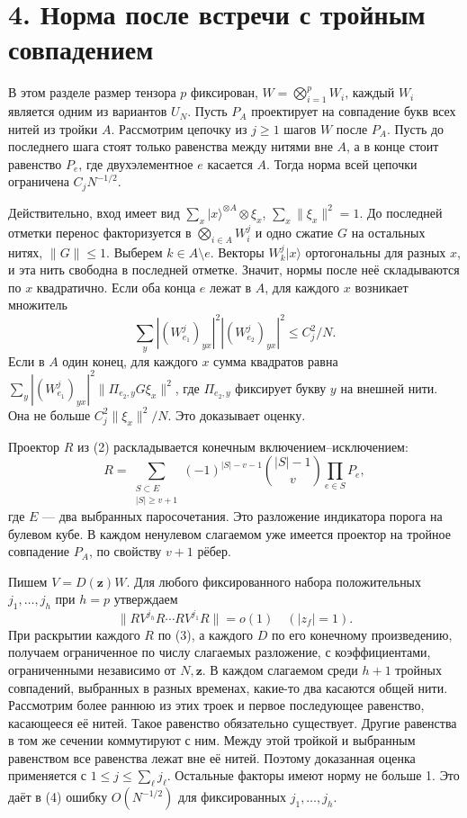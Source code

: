 \documentclass[11pt,a4paper]{article}
\newcommand{\sect}[1]{\section*{\sffamily\color{ink}#1}}
\begin{document}
\newpage
\sect{4. Норма после встречи с тройным совпадением}
В этом разделе размер тензора \(p\) фиксирован, \(W=\bigotimes_{i=1}^p W_i\), каждый \(W_i\) является одним из вариантов \(U_N\).
Пусть \(P_A\) проектирует на совпадение букв всех нитей из тройки \(A\).
Рассмотрим цепочку из \(j\ge1\) шагов \(W\) после \(P_A\). Пусть до последнего шага стоят только равенства между нитями вне \(A\), а в конце стоит равенство \(P_e\), где двухэлементное \(e\) касается \(A\). Тогда норма всей цепочки ограничена \(C_j N^{-1/2}\).

Действительно, вход имеет вид \(\sum_x |x\rangle^{\otimes A}\otimes \xi_x\),
\(\sum_x\|\xi_x\|^2=1\). До последней отметки перенос факторизуется в
\(\bigotimes_{i\in A} W_i^j\) и одно сжатие \(G\) на остальных нитях,
\(\|G\|\le1\). Выберем \(k\in A\setminus e\). Векторы \(W_k^j|x\rangle\) ортогональны для разных \(x\), и эта нить свободна в последней отметке. Значит, нормы после неё складываются по \(x\) квадратично.
Если оба конца \(e\) лежат в \(A\), для каждого \(x\) возникает множитель
\[
       \sum_y |(W_{e_1}^j)_{y x}|^2 |(W_{e_2}^j)_{y x}|^2
                      \le C_j^2/N.
\]
Если в \(A\) один конец, для каждого \(x\) сумма квадратов равна
\(\sum_y |(W_{e_1}^j)_{y x}|^2\|\Pi_{e_2,y} G\xi_x\|^2\), где \(\Pi_{e_2,y}\) фиксирует букву \(y\) на внешней нити. Она не больше
\(C_j^2\|\xi_x\|^2/N\). Это доказывает оценку.

Проектор \(R\) из (2) раскладывается конечным включением--исключением:
\[
 R=\sum_{\substack{S\subset E\\|S|\ge v+1}}
     (-1)^{|S|-v-1}\binom{|S|-1}{v}\prod_{e\in S}P_e,       \tag{3}
\]
где \(E\) — два выбранных паросочетания. Это разложение индикатора порога на булевом кубе. В каждом ненулевом слагаемом уже имеется проектор на тройное совпадение \(P_A\), по свойству \(v+1\) рёбер.

Пишем \(V=D(\mathbf z)W\). Для любого фиксированного набора положительных \(j_1,\ldots,j_h\) при \(h=p\) утверждаем
\[
             \|R V^{j_h} R\cdots R V^{j_1} R\|=o(1)
             \quad (|z_f|=1) .                               \tag{4}
\]
При раскрытии каждого \(R\) по (3), а каждого \(D\) по его конечному произведению, получаем ограниченное по числу слагаемых разложение, с коэффициентами, ограниченными независимо от \(N,\mathbf z\).
В каждом слагаемом среди \(h+1\) тройных совпадений, выбранных в разных временах, какие-то два касаются общей нити. Рассмотрим более раннюю из этих троек и первое последующее равенство, касающееся её нитей. Такое равенство обязательно существует. Другие равенства в том же сечении коммутируют с ним. Между этой тройкой и выбранным равенством все равенства лежат вне её нитей. Поэтому доказанная оценка применяется с \(1\le j\le\sum_\ell j_\ell\).
Остальные факторы имеют норму не больше 1. Это даёт в (4) ошибку \(O(N^{-1/2})\) для фиксированных \(j_1,\ldots,j_h\).
\end{document}
